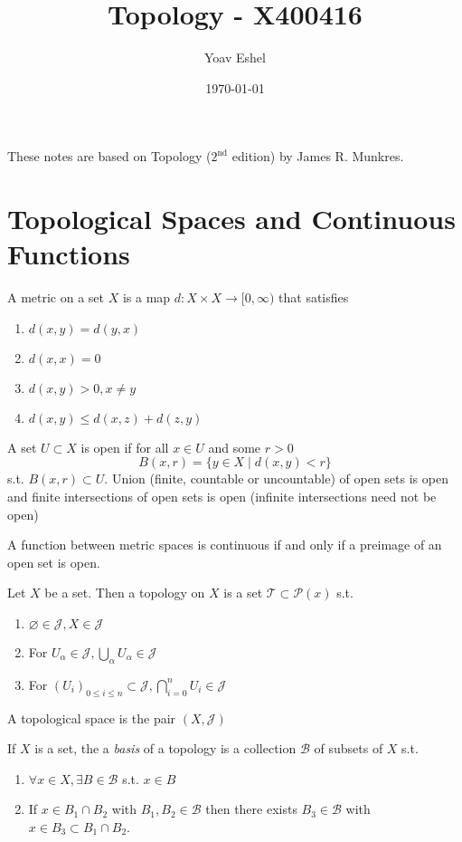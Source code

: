 \documentclass{article}
\title{Topology - X400416}
\author{Yoav Eshel}
\date{\today}
\begin{document}
\maketitle
\tableofcontents
\newpage
These notes are based on Topology ($2^\text{nd}$ edition) by James R. Munkres. 
\section{Topological Spaces and Continuous Functions}
A metric on a set $X$ is a map $d:X\times X \to [0,\infty)$ that satisfies
\begin{enumerate}
    \item $d(x,y)=d(y,x)$
    \item $d(x,x)=0$
    \item $d(x,y)>0, x\not=y$
    \item $d(x,y)\leq d(x,z)+d(z,y)$
\end{enumerate}
A set $U\subset X$ is open if for all $x\in U$ and some $r>0$ 
$$
    B(x,r) = \{y\in X\mid d(x,y)<r\}
$$
s.t. $B(x,r)\subset U$.
Union (finite, countable or uncountable) of open sets is open and finite intersections of open sets is open (infinite intersections need not be open)

A function between metric spaces is continuous if and only if a preimage of an open set is open. 

\begin{definition}
    Let $X$ be a set. Then a topology on $X$ is a set $\mathcal{T}\subset\mathcal{P}(x)$ s.t.
    \begin{enumerate}
        \item $\varnothing\in\mathcal{J}, X\in\mathcal{J}$
        \item For $U_{\alpha}\in\mathcal{J}, \bigcup_{\alpha}U_{\alpha}\in\mathcal{J}$
        \item For $(U_i)_{0\leq i\leq n}\subset\mathcal{J}, \bigcap_{i=0}^n U_i\in\mathcal{J}$
    \end{enumerate}
    A topological space is the pair $(X,\mathcal{J})$
\end{definition}

If $X$ is a set, the a \textit{basis} of a topology is a collection $\mathcal{B}$ of subsets of $X$ s.t.
\begin{enumerate}
    \item $\forall x\in X, \exists B\in\mathcal{B}$ s.t. $x\in B$
    \item If $x\in B_1\cap B_2$ with $B_1,B_2\in\mathcal{B}$ then there exists $B_3\in\mathcal{B}$ with $x\in B_3\subset B_1\cap B_2$.
\end{enumerate}
    
\end{document}
